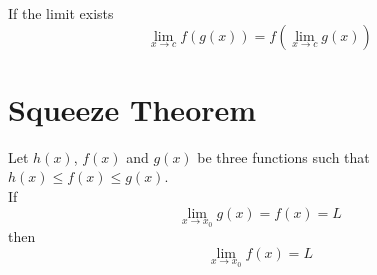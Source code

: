 \documentclass{article}
\begin{document}
If the limit exists
\[
    \lim_{x\to c}f(g(x))=f(\lim_{x\to c}g(x))
\]

\section{Squeeze Theorem}

Let \(h(x)\), \(f(x)\) and \(g(x)\) be three functions such that
\(h(x) \leq f(x) \leq g(x)\). \\
If
\[
    \lim_{x \to x_0} g(x) = f(x) = L
\]
then
\[
    \lim_{x \to x_0} f(x) = L
\]


\end{document}
